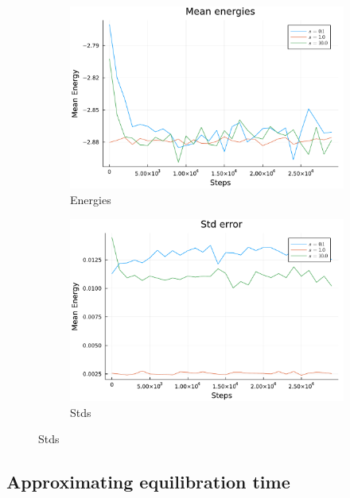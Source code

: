 \documentclass[
	a4paper, %
	10pt, %
]{CSUniSchoolLabReport}
\begin{document}
\begin{figure}[H]
	\begin{subfigure}[b]{0.49\textwidth}
		\centering
		\includegraphics[width=\textwidth]{../saves/task1a.energies.pdf}
		\caption{Energies}
	\end{subfigure}
	\hfill
	\begin{subfigure}[b]{0.49\textwidth}
		\centering
		\includegraphics[width=\textwidth]{../saves/task1a.stds.pdf}
		\caption{Stds}
	\end{subfigure}
\end{figure}

\subsection{Approximating equilibration time}
\end{document}

